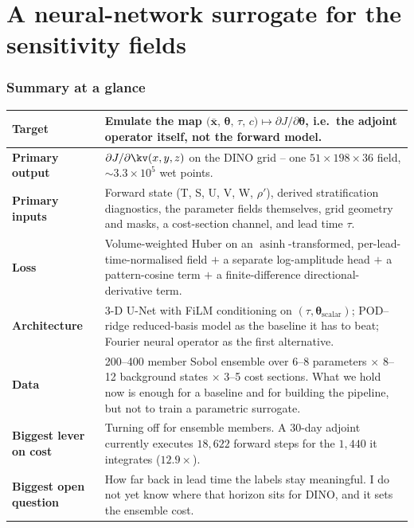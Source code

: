 \part{A neural-network surrogate for the sensitivity fields}

\section{Summary at a glance}

\begin{center}
\begin{tabularx}{\textwidth}{@{}lL@{}}
\toprule
\textbf{Target} & Emulate the map
$\big(\bar{\mathbf{x}},\,\boldsymbol{\theta},\,\tau,\,c\big)\mapsto
\partial J/\partial\boldsymbol{\theta}$, i.e.\ the adjoint operator itself,
not the forward model.\\
\midrule
\textbf{Primary output} & $\partial J/\partial\kv(x,y,z)$ on the DINO grid --
one $51\times198\times36$ field, $\sim\!3.3\times10^{5}$ wet points.\\
\textbf{Primary inputs} & Forward state (T, S, U, V, W, $\rho'$), derived
stratification diagnostics, the parameter fields themselves, grid geometry and
masks, a cost-section channel, and lead time $\tau$.\\
\textbf{Loss} & Volume-weighted Huber on an $\operatorname{asinh}$-transformed,
per-lead-time-normalised field $+$ a separate log-amplitude head $+$ a
pattern-cosine term $+$ a finite-difference directional-derivative term.\\
\textbf{Architecture} & 3-D U-Net with FiLM conditioning on $(\tau,
\boldsymbol{\theta}_{\text{scalar}})$; POD--ridge reduced-basis model as the
baseline it has to beat; Fourier neural operator as the first alternative.\\
\textbf{Data} & 200--400 member Sobol ensemble over 6--8 parameters
$\times$ 8--12 background states $\times$ 3--5 cost sections. What we hold now
is enough for a baseline and for building the pipeline, but not to train a
parametric surrogate.\\
\textbf{Biggest lever on cost} & Turning off  for ensemble
members. A 30-day adjoint currently executes $18{,}622$ forward steps for the
$1{,}440$ it integrates ($12.9\times$).\\
\textbf{Biggest open question} & How far back in lead time the labels stay
meaningful. I do not yet know where that horizon sits for DINO, and it sets
the ensemble cost.\\
\bottomrule
\end{tabularx}
\end{center}

